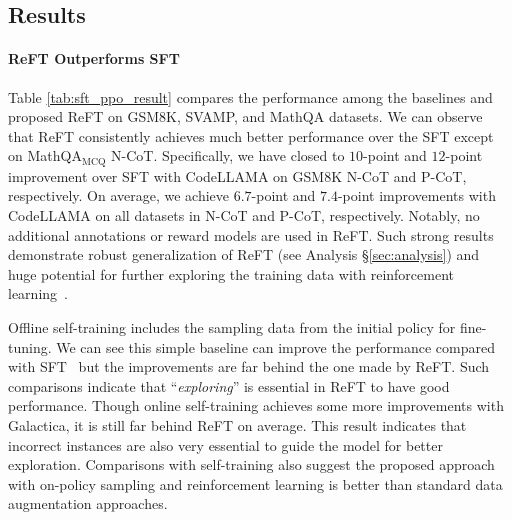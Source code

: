 \subsection{Results}
\label{sec:results}

\paragraph{ReFT Outperforms SFT}
Table \ref{tab:sft_ppo_result} compares the performance among the baselines and proposed ReFT on GSM8K, SVAMP, and MathQA datasets. 
We can observe that ReFT consistently achieves much better performance over the SFT 
except on MathQA$_\text{MCQ}$ N-CoT.
Specifically, we have closed to $10$-point and $12$-point improvement over SFT with CodeLLAMA on GSM8K N-CoT and P-CoT, respectively. 
On average, we achieve $6.7$-point and $7.4$-point improvements with CodeLLAMA on all datasets in N-CoT and P-CoT, respectively. 
Notably, no additional annotations or reward models are used in ReFT. 
Such strong results demonstrate robust generalization of ReFT (see Analysis \S\ref{sec:analysis}) and huge potential for further exploring the training data with reinforcement learning~\cite{lu2023reinforcement}. 

Offline self-training includes the sampling data from the initial policy for fine-tuning. 
We can see this simple baseline can improve the performance compared with SFT~\cite{he2020revisiting,gulcehre2023reinforced} but the improvements are far behind the one made by ReFT. 
Such comparisons indicate that ``\textit{exploring}'' is essential in ReFT to have good performance. 
Though online self-training achieves some more improvements with Galactica, 
it is still far behind ReFT on average.
This result indicates that incorrect instances are also very essential to guide the model for better exploration. 
Comparisons with self-training also suggest the proposed approach with on-policy sampling and reinforcement learning is better than standard data augmentation approaches. 

